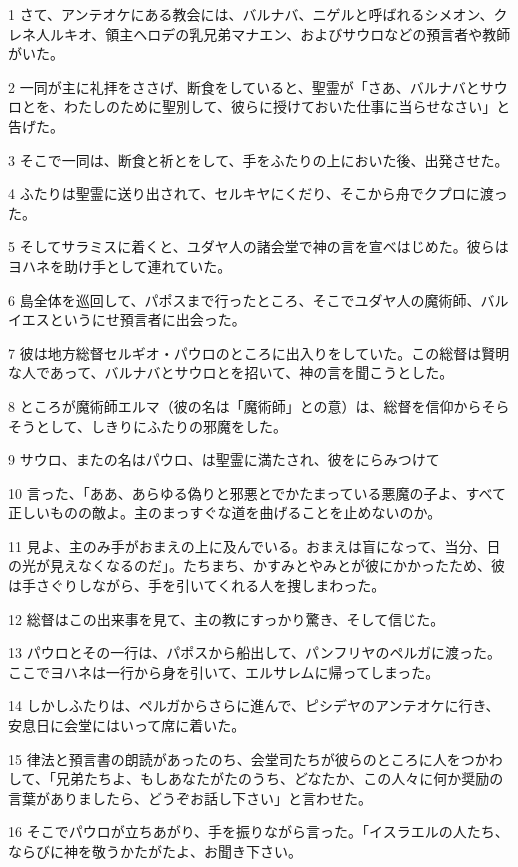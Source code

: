 \par 1 さて、アンテオケにある教会には、バルナバ、ニゲルと呼ばれるシメオン、クレネ人ルキオ、領主ヘロデの乳兄弟マナエン、およびサウロなどの預言者や教師がいた。
\par 2 一同が主に礼拝をささげ、断食をしていると、聖霊が「さあ、バルナバとサウロとを、わたしのために聖別して、彼らに授けておいた仕事に当らせなさい」と告げた。
\par 3 そこで一同は、断食と祈とをして、手をふたりの上においた後、出発させた。
\par 4 ふたりは聖霊に送り出されて、セルキヤにくだり、そこから舟でクプロに渡った。
\par 5 そしてサラミスに着くと、ユダヤ人の諸会堂で神の言を宣べはじめた。彼らはヨハネを助け手として連れていた。
\par 6 島全体を巡回して、パポスまで行ったところ、そこでユダヤ人の魔術師、バルイエスというにせ預言者に出会った。
\par 7 彼は地方総督セルギオ・パウロのところに出入りをしていた。この総督は賢明な人であって、バルナバとサウロとを招いて、神の言を聞こうとした。
\par 8 ところが魔術師エルマ（彼の名は「魔術師」との意）は、総督を信仰からそらそうとして、しきりにふたりの邪魔をした。
\par 9 サウロ、またの名はパウロ、は聖霊に満たされ、彼をにらみつけて
\par 10 言った、「ああ、あらゆる偽りと邪悪とでかたまっている悪魔の子よ、すべて正しいものの敵よ。主のまっすぐな道を曲げることを止めないのか。
\par 11 見よ、主のみ手がおまえの上に及んでいる。おまえは盲になって、当分、日の光が見えなくなるのだ」。たちまち、かすみとやみとが彼にかかったため、彼は手さぐりしながら、手を引いてくれる人を捜しまわった。
\par 12 総督はこの出来事を見て、主の教にすっかり驚き、そして信じた。
\par 13 パウロとその一行は、パポスから船出して、パンフリヤのペルガに渡った。ここでヨハネは一行から身を引いて、エルサレムに帰ってしまった。
\par 14 しかしふたりは、ペルガからさらに進んで、ピシデヤのアンテオケに行き、安息日に会堂にはいって席に着いた。
\par 15 律法と預言書の朗読があったのち、会堂司たちが彼らのところに人をつかわして、「兄弟たちよ、もしあなたがたのうち、どなたか、この人々に何か奨励の言葉がありましたら、どうぞお話し下さい」と言わせた。
\par 16 そこでパウロが立ちあがり、手を振りながら言った。「イスラエルの人たち、ならびに神を敬うかたがたよ、お聞き下さい。
